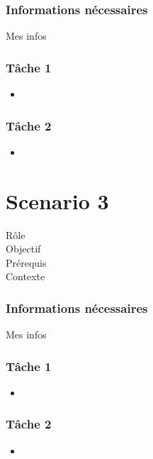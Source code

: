 \documentclass{EPL-master-thesis-covers-FR}
\begin{document}
				\subsubsection*{Informations nécessaires}
					Mes infos
					
				\subsubsection*{Tâche 1}
					\begin{itemize}
						\item 
					\end{itemize}
					
				\subsubsection*{Tâche 2}
					\begin{itemize}
						\item 
					\end{itemize}
			
			\section{Scenario 3}
				\begin{description}
					\item[Rôle]
					\item[Objectif]
					\item[Prérequis]
					\item[Contexte]
				\end{description}
							
				\subsubsection*{Informations nécessaires}
					Mes infos
					
				\subsubsection*{Tâche 1}
					\begin{itemize}
						\item 
					\end{itemize}
					
				\subsubsection*{Tâche 2}
					\begin{itemize}
						\item 
					\end{itemize}
			
\end{document}
